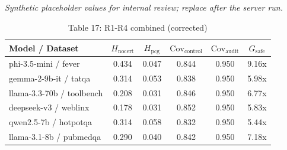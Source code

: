 

\begin{table}[h]
\centering
\small
  \textit{Synthetic placeholder values for internal review; replace after the server run.}
\caption{Table 17: R1-R4 combined (corrected)}
\label{tab:r1_r4_combined}
\begin{tabular}{l|cc|cc|c}
\hline
Model / Dataset & $H_{\mathrm{nocert}}$ & $H_{\mathrm{pcg}}$ & $\mathrm{Cov}_{\mathrm{control}}$ & $\mathrm{Cov}_{\mathrm{audit}}$ & $G_{\mathrm{safe}}$ \\
\hline
phi-3.5-mini / fever & 0.434 & 0.047 & 0.844 & 0.950 & 9.16x \\
gemma-2-9b-it / tatqa & 0.314 & 0.053 & 0.838 & 0.950 & 5.98x \\
llama-3.3-70b / toolbench & 0.208 & 0.031 & 0.846 & 0.950 & 6.77x \\
deepseek-v3 / weblinx & 0.178 & 0.031 & 0.852 & 0.950 & 5.83x \\
qwen2.5-7b / hotpotqa & 0.314 & 0.058 & 0.832 & 0.950 & 5.44x \\
llama-3.1-8b / pubmedqa & 0.290 & 0.040 & 0.842 & 0.950 & 7.18x \\
\hline
\end{tabular}
\end{table}
